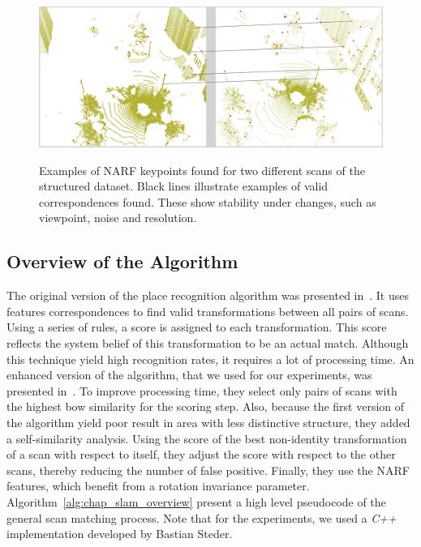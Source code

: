 \begin{figure}[H]
    \centering
    \includegraphics[width=0.995\linewidth]{img/chap_slam/features_line.png}\\
    \caption{Examples of NARF keypoints found for two different scans of the structured dataset. Black lines illustrate examples of valid correspondences found. These show stability under changes, such as viewpoint, noise and resolution.}
    \label{fig:chap_slam_features_correspondences}
\end{figure}


\subsection{Overview of the Algorithm}
\label{ssec:chap_slam_algo}

The original version of the place recognition algorithm was presented in~\cite{Steder2010}. It uses features correspondences to find valid transformations between all pairs of scans. Using a series of rules, a score is assigned to each transformation. This score reflects the system belief of this transformation to be an actual match. Although this technique yield high recognition rates, it requires a lot of processing time. An enhanced version of the algorithm, that we used for our experiments, was presented in~\cite{Steder2011b}. To improve processing time, they select only pairs of scans with the highest \gls*{bow} similarity for the scoring step. Also, because the first version of the algorithm yield poor result in area with less distinctive structure, they added a self-similarity analysis. Using the score of the best non-identity transformation of a scan with respect to itself, they adjust the score with respect to the other scans, thereby reducing the number of false positive. Finally, they use the NARF features, which benefit from a rotation invariance parameter. Algorithm~\ref{alg:chap_slam_overview} present a high level pseudocode of the general scan matching process. Note that for the experiments, we used a \textit{C++} implementation developed by Bastian Steder.

